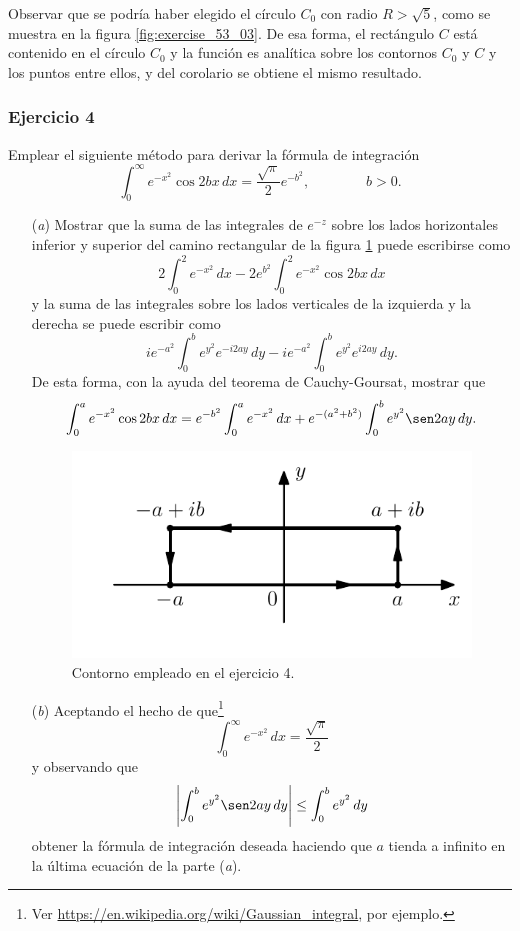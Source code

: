\documentclass[a4paper]{report}
\begin{document}
Observar que se podría haber elegido el círculo \(C_0\) con radio \(R>\sqrt{5}\), como se muestra en la figura  \ref{fig:exercise_53_03}. De esa forma, el rectángulo \(C\) está contenido en el círculo \(C_0\) y la función es analítica sobre los contornos \(C_0\) y \(C\) y los puntos entre ellos, y del corolario se obtiene el mismo resultado.

\subsubsection*{Ejercicio 4}

Emplear el siguiente método para derivar la fórmula de integración
\[
 \int_0^\infty e^{-x^2}\cos 2bx\,dx=\frac{\sqrt{\pi}}{2}e^{-b^2},
 \qquad\qquad b>0. 
\]
\begin{enumerate}
 \item[(\textit{a})] Mostrar que la suma de las integrales de \(e^{-z}\) sobre los lados horizontales inferior y superior del camino rectangular de la figura \ref{fig:exercise_53_04} puede escribirse como
 \[
  2\int_0^2e^{-x^2}\,dx-2e^{b^2}\int_0^2e^{-x^2}\cos2bx\,dx
 \]
 y la suma de las integrales sobre los lados verticales de la izquierda y la derecha se puede escribir como
 \[
  ie^{-a^2}\int_0^be^{y^2}e^{-i2ay}\,dy-ie^{-a^2}\int_0^be^{y^2}e^{i2ay}\,dy.
 \]
 De esta forma, con la ayuda del teorema de Cauchy-Goursat, mostrar que 
 \[
  \int_0^ae^{-x^2}\cos2bx\,dx=e^{-b^2}\int_0^ae^{-x^2}\,dx+e^{-(a^2+b^2)}\int_0^be^{y^2}\sen2ay\,dy.
 \]
 \begin{figure}[!htb]
  \begin{minipage}[c]{0.40\textwidth}
    \includegraphics[width=\textwidth]{figuras/exercise_53_04.pdf}
  \end{minipage}\hfill
  \begin{minipage}[c]{0.50\textwidth}
    \caption{
        Contorno empleado en el ejercicio 4.
    }\label{fig:exercise_53_04}
  \end{minipage}
\end{figure}
 \item[(\textit{b})] Aceptando el hecho de que\footnote{Ver \url{https://en.wikipedia.org/wiki/Gaussian_integral}, por ejemplo.} 
 \[
  \int_0^\infty e^{-x^2}\,dx=\frac{\sqrt{\pi}}{2}
 \]
 y observando que 
 \[
  \left|\int_0^be^{y^2}\sen2ay\,dy\right|\leq\int_0^be^{y^2}\,dy
 \]
 obtener la fórmula de integración deseada haciendo que \(a\) tienda a infinito en la última ecuación de la parte (\textit{a}).
\end{enumerate}
\end{document}
